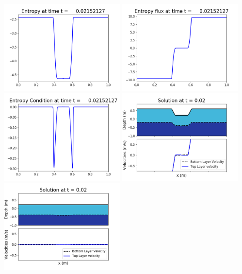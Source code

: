 \documentclass[11pt]{article}
\begin{document}
\vskip 10pt 
\includegraphics[width=0.475\textwidth]{frame0060fig1007.png}
\includegraphics[width=0.475\textwidth]{frame0060fig1008.png}
\vskip 10pt 
\includegraphics[width=0.475\textwidth]{frame0060fig1009.png}
\vskip 10pt 
\includegraphics[width=0.475\textwidth]{frame0061fig1001.png}
\includegraphics[width=0.475\textwidth]{frame0061fig1002.png}
\end{document}
